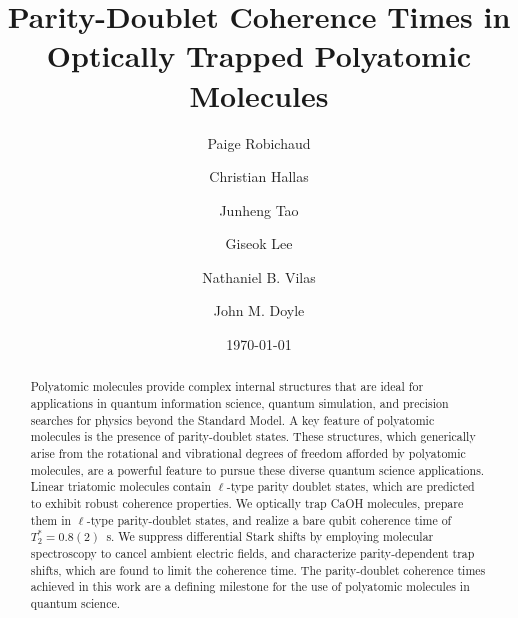 \documentclass[
superscriptaddress,
twocolumn,
amsmath,amssymb,
aps,
prx,
nofootinbib,
]{revtex4-2}
\begin{document}
\title{Parity-Doublet Coherence Times in Optically Trapped Polyatomic Molecules}

\author{Paige Robichaud}
\author{Christian Hallas}
\author{Junheng Tao}
\author{Giseok Lee}
\author{Nathaniel B. Vilas}
\author{John M. Doyle}

\date{\today}

\begin{abstract}
Polyatomic molecules provide complex internal structures that are ideal for applications in quantum information science, quantum simulation, and precision searches for physics beyond the Standard Model. A key feature of polyatomic molecules is the presence of parity-doublet states. These structures, which generically arise from the rotational and vibrational degrees of freedom afforded by polyatomic molecules, are a powerful feature to pursue these diverse quantum science applications. Linear triatomic molecules contain $\ell$-type parity doublet states, which are predicted to exhibit robust coherence properties. We optically trap CaOH molecules, prepare them in $\ell$-type parity-doublet states, and realize a bare qubit coherence time of $T_2^* = 0.8(2)$~s. We suppress differential Stark shifts by employing molecular spectroscopy to cancel ambient electric fields, and characterize  parity-dependent trap shifts, which are found to limit the coherence time. The parity-doublet coherence times achieved in this work are a defining milestone for the use of polyatomic molecules in quantum science.

\end{abstract}

\maketitle
\end{document}
